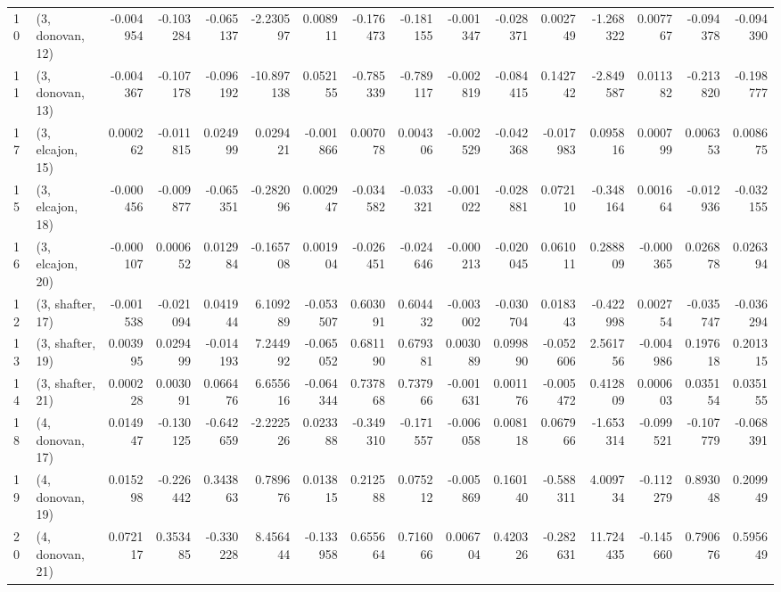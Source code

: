 \begin{tabular}{llrrrrrrrrrrrrrr}
10 &  (3, donovan, 12) &  -0.004954 & -0.103284 & -0.065137 &  -2.230597 &  0.008911 &  -0.176473 & -0.181155 & -0.001347 & -0.028371 &  0.002749 &  -1.268322 &  0.007767 & -0.094378 & -0.094390 \\
11 &  (3, donovan, 13) &  -0.004367 & -0.107178 & -0.096192 & -10.897138 &  0.052155 &  -0.785339 & -0.789117 & -0.002819 & -0.084415 &  0.142742 &  -2.849587 &  0.011382 & -0.213820 & -0.198777 \\
17 &  (3, elcajon, 15) &   0.000262 & -0.011815 &  0.024999 &   0.029421 & -0.001866 &   0.007078 &  0.004306 & -0.002529 & -0.042368 & -0.017983 &   0.095816 &  0.000799 &  0.006353 &  0.008675 \\
15 &  (3, elcajon, 18) &  -0.000456 & -0.009877 & -0.065351 &  -0.282096 &  0.002947 &  -0.034582 & -0.033321 & -0.001022 & -0.028881 &  0.072110 &  -0.348164 &  0.001664 & -0.012936 & -0.032155 \\
16 &  (3, elcajon, 20) &  -0.000107 &  0.000652 &  0.012984 &  -0.165708 &  0.001904 &  -0.026451 & -0.024646 & -0.000213 & -0.020045 &  0.061011 &   0.288809 & -0.000365 &  0.026878 &  0.026394 \\
12 &  (3, shafter, 17) &  -0.001538 & -0.021094 &  0.041944 &   6.109289 & -0.053507 &   0.603091 &  0.604432 & -0.003002 & -0.030704 &  0.018343 &  -0.422998 &  0.002754 & -0.035747 & -0.036294 \\
13 &  (3, shafter, 19) &   0.003995 &  0.029499 & -0.014193 &   7.244992 & -0.065052 &   0.681190 &  0.679381 &  0.003089 &  0.099890 & -0.052606 &   2.561756 & -0.004986 &  0.197618 &  0.201315 \\
14 &  (3, shafter, 21) &   0.000228 &  0.003091 &  0.066476 &   6.655616 & -0.064344 &   0.737868 &  0.737966 & -0.001631 &  0.001176 & -0.005472 &   0.412809 &  0.000603 &  0.035154 &  0.035155 \\
18 &  (4, donovan, 17) &   0.014947 & -0.130125 & -0.642659 &  -2.222526 &  0.023388 &  -0.349310 & -0.171557 & -0.006058 &  0.008118 &  0.067966 &  -1.653314 & -0.099521 & -0.107779 & -0.068391 \\
19 &  (4, donovan, 19) &   0.015298 & -0.226442 &  0.343863 &   0.789676 &  0.013815 &   0.212588 &  0.075212 & -0.005869 &  0.160140 & -0.588311 &   4.009734 & -0.112279 &  0.893048 &  0.209949 \\
20 &  (4, donovan, 21) &   0.072117 &  0.353485 & -0.330228 &   8.456444 & -0.133958 &   0.655664 &  0.716066 &  0.006704 &  0.420326 & -0.282631 &  11.724435 & -0.145660 &  0.790676 &  0.595649 \\

\end{tabular}
